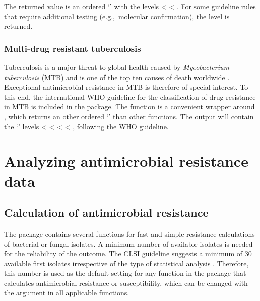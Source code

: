 \documentclass[article, shortnames]{jss}
\newcommand{\class}[1]{`\code{#1}'}
\newcommand{\fct}[1]{\code{#1()}}
\begin{document}
The returned value is an ordered \class{factor} with the levels
 <  < .  For
some guideline rules that require additional testing (e.g.,~molecular
confirmation), the level  is returned.

\subsubsection{Multi-drug resistant tuberculosis}

Tuberculosis is a major threat to global health caused by
\emph{Mycobacterium tuberculosis} (MTB) and is one of the top ten causes of
death worldwide \citep{World_Health_Organization2018-mk}.  Exceptional
antimicrobial resistance in MTB is therefore of special interest.  To this
end, the international WHO guideline for the classification of drug
resistance in MTB \citep{World_Health_Organization_TB-ji} is included in the
 package.  The \fct{mdr\_tb} function is a convenient wrapper
around , which returns an other ordered
\class{factor} than other \fct{mdro} functions.  The output will contain the
\class{factor} levels  <  <
 <  < , following the WHO guideline.

\section{Analyzing antimicrobial resistance data} \label{sec:analyzing}

\subsection{Calculation of antimicrobial resistance}
\label{sec:analyzingcalc}

The  package contains several functions for fast and simple
resistance calculations of bacterial or fungal isolates.  A minimum number
of available isolates is needed for the reliability of the outcome.  The
CLSI guideline suggests a minimum of 30 available first isolates
irrespective of the type of statistical analysis
\citep{Clinical_and_Laboratory_Standards_Institute2014-fb}.  Therefore, this
number is used as the default setting for any function in the package that
calculates antimicrobial resistance or susceptibility, which can be changed
with the  argument in all applicable functions.
\end{document}
